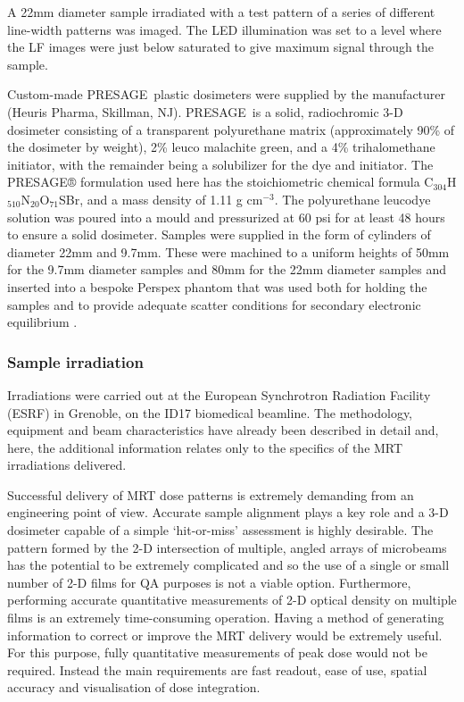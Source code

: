 	
	A 22mm diameter sample irradiated with a test pattern of a series of different line-width patterns was imaged. The LED illumination was set to a level where the LF images were just below saturated to give maximum signal through the sample. 
	
	
	
	Custom-made PRESAGE\textregistered \ plastic dosimeters were supplied by the manufacturer (Heuris Pharma, Skillman, NJ). PRESAGE\textregistered \ is a solid, radiochromic 3-D dosimeter consisting of a transparent polyurethane matrix (approximately 90\% of the dosimeter by weight), 2\% leuco malachite green, and a 4\% trihalomethane initiator, with the remainder being a solubilizer for the dye and initiator. The PRESAGE® formulation used here has the stoichiometric chemical formula C$_{304}$H$_{510}$N$_{20}$O$_{71}$SBr, and a mass density of 1.11 g cm$^{-3}$.  The polyurethane leucodye solution was poured into a mould and pressurized at 60 psi for at least 48 hours to ensure a solid dosimeter. Samples were supplied in the form of cylinders of diameter 22mm and 9.7mm. These were machined to a uniform heights of 50mm for the 9.7mm diameter samples and 80mm for the 22mm diameter samples and inserted into a bespoke Perspex phantom that was used both for holding the samples and to provide adequate scatter conditions for secondary electronic equilibrium \cite{doranestablishing2013}.
	
	\subsubsection{Sample irradiation}
	Irradiations were carried out at the European Synchrotron Radiation Facility (ESRF) in Grenoble, on the ID17 biomedical beamline. The methodology, equipment and beam characteristics have already been described in detail \cite{abdulrahmansophisticated2011 , doranestablishing2013 , doranan2010} and, here, the additional information relates only to the specifics of the MRT irradiations delivered. 
	
	Successful delivery of MRT dose patterns is extremely demanding from an engineering point of view. Accurate sample alignment plays a key role and a 3-D dosimeter capable of a simple `hit-or-miss' assessment is highly desirable. The pattern formed by the 2-D intersection of multiple, angled arrays of microbeams has the potential to be extremely complicated and so the use of a single or small number of 2-D films for QA purposes is not a viable option. Furthermore, performing accurate quantitative measurements of 2-D optical density on multiple films is an extremely time-consuming operation. Having a method of generating information to correct or improve the MRT delivery would be extremely useful. For this purpose, fully quantitative measurements of peak dose would not be required. Instead the main requirements are fast readout, ease of use, spatial accuracy and visualisation of dose integration. 
	
